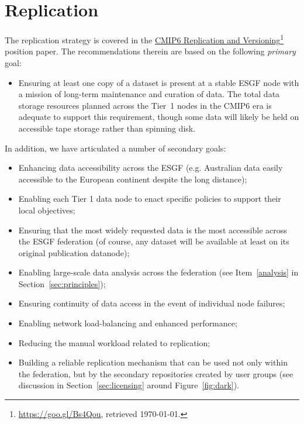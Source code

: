 \documentclass[gmd,manuscript]{copernicus}
\newcommand{\pllabel}[1]{\label{p-#1}\linelabel{l-#1}}
\newcommand{\urlref}[2] {\href{#1}{#2}\footnote{\url{#1}, retrieved \today.}}
\begin{document}
\section{Replication}
\label{sec:replica}

\pllabel{RC3-21}
The replication strategy is covered in the
\urlref{https://goo.gl/Bs4Qou}{CMIP6 Replication and Versioning}
position paper. The recommendations therein are based on the following
\emph{primary} goal:

\begin{itemize}
\item Ensuring at least one copy of a dataset is present at a stable
  ESGF node with a mission of long-term maintenance and curation of
  data. The total data storage resources planned across the Tier~1
  nodes in the CMIP6 era is adequate to support this requirement,
  though some data will likely be held on accessible tape storage
  rather than spinning disk.
\end{itemize}

In addition, we have articulated a number of secondary goals:

\begin{itemize}
\item Enhancing data accessibility across the ESGF (e.g. Australian
  data easily accessible to the European continent despite the long
  distance);
\item Enabling each Tier 1 data node to enact specific policies to
  support their local objectives;
\item Ensuring that the most widely requested data is the most
  accessible across the ESGF federation
  \pllabel{RC1-58}
  (of course, any dataset will be available at least on its original
  publication datanode);
\item Enabling large-scale data analysis across the federation (see
  Item~\ref{analysis} in Section~\ref{sec:principles});
\item Ensuring continuity of data access in the event of individual
  node failures;
\item Enabling network load-balancing and enhanced performance;
\item Reducing the manual workload related to replication;
\item Building a reliable replication mechanism that can be used not
  only within the federation, but by the secondary repositories
  created by user groups (see discussion in
  Section~\ref{sec:licensing} around Figure~\ref{fig:dark}).
\end{itemize}
\end{document}
